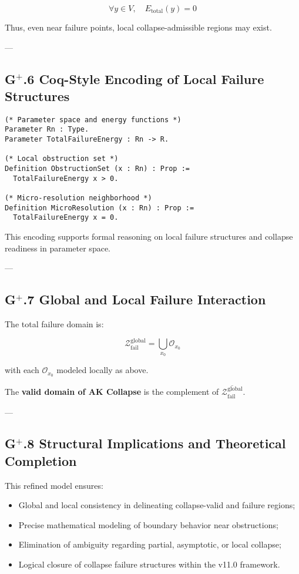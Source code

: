 \documentclass[11pt]{article}
\begin{document}
\[
\forall y \in V, \quad E_{\mathrm{total}}(y) = 0
\]

Thus, even near failure points, local collapse-admissible regions may exist.

---

\subsection*{G$^{+}$.6 Coq-Style Encoding of Local Failure Structures}

\begin{lstlisting}[language=Coq]
(* Parameter space and energy functions *)
Parameter Rn : Type.
Parameter TotalFailureEnergy : Rn -> R.

(* Local obstruction set *)
Definition ObstructionSet (x : Rn) : Prop :=
  TotalFailureEnergy x > 0.

(* Micro-resolution neighborhood *)
Definition MicroResolution (x : Rn) : Prop :=
  TotalFailureEnergy x = 0.
\end{lstlisting}

This encoding supports formal reasoning on local failure structures and collapse readiness in parameter space.

---

\subsection*{G$^{+}$.7 Global and Local Failure Interaction}

The total failure domain is:

\[
\mathcal{Z}_{\mathrm{fail}}^{\mathrm{global}} = \bigcup_{x_0} \mathcal{O}_{x_0}
\]

with each $\mathcal{O}_{x_0}$ modeled locally as above.

The \textbf{valid domain of AK Collapse} is the complement of $\overline{\mathcal{Z}_{\mathrm{fail}}^{\mathrm{global}}}$.

---

\subsection*{G$^{+}$.8 Structural Implications and Theoretical Completion}

This refined model ensures:

\begin{itemize}
    \item Global and local consistency in delineating collapse-valid and failure regions;
    \item Precise mathematical modeling of boundary behavior near obstructions;
    \item Elimination of ambiguity regarding partial, asymptotic, or local collapse;
    \item Logical closure of collapse failure structures within the v11.0 framework.
\end{itemize}
\end{document}
